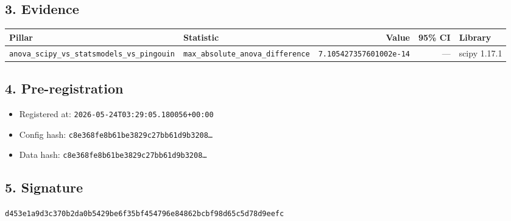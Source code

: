 \documentclass{article}
\begin{document}
\subsection*{3. Evidence}
\begin{tabular}{llrrl}\toprule
\textbf{Pillar} & \textbf{Statistic} & \textbf{Value} & \textbf{95\% CI} & \textbf{Library} \\\midrule
\texttt{anova\_scipy\_vs\_statsmodels\_vs\_pingouin} & \texttt{max\_absolute\_anova\_difference} & \texttt{7.105427357601002e-14} & --- & scipy 1.17.1 \\
\bottomrule\end{tabular}
\subsection*{4. Pre-registration}
\begin{itemize}
\item Registered at: \texttt{2026-05-24T03:29:05.180056+00:00}
\item Config hash: \texttt{c8e368fe8b61be3829c27bb61d9b3208\dots}
\item Data hash: \texttt{c8e368fe8b61be3829c27bb61d9b3208\dots}
\end{itemize}
\subsection*{5. Signature}
\texttt{d453e1a9d3c370b2da0b5429be6f35bf454796e84862bcbf98d65c5d78d9eefc}\\
\end{document}
